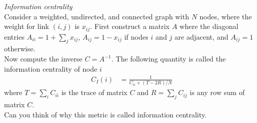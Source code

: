 \documentclass[12pt]{article}
\newenvironment{problem}[2][Problem]{\begin{trivlist}
\item[\hskip \labelsep {\bfseries #1}\hskip \labelsep {\bfseries #2.}]}{\end{trivlist}}
\begin{document}
	\begin{problem}{2}
		\textit{Information centrality}\\
		Consider a weighted, undirected, and connected graph with $N$ nodes, where the weight for link $(i, j)$ is $x_{ij}$. First construct a matrix $A$ where the diagonal entries $A_{ii} = 1 + \sum_j x_{ij}$, $A_{ij} = 1-x_{ij}$ if nodes $i$ and $j$ are adjacent, and $A_{ij} = 1$ otherwise. \\
		Now compute the inverse $C = A^{-1}$. The following quantity is called the information centrality of node $i$
		\begin{align*}
			C_I(i) &= \frac{1}{C_{ii}+(T-2R)/N}
		\end{align*}
		where $T = \sum_i C_{ii}$ is the trace of matrix $C$ and $R = \sum_jC_{ij}$ is any row sum of matrix $C$.\\
		Can you think of why this metric is called information centrality.
	\end{problem}
\end{document}
